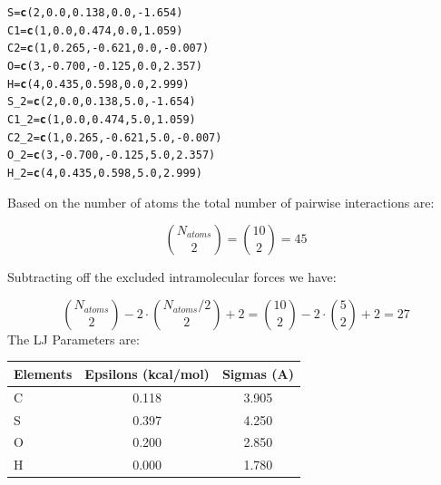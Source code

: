 \documentclass{article}\usepackage[]{graphicx}\usepackage[]{color}
\makeatletter
\newcommand{\hlnum}[1]{\textcolor[rgb]{0.686,0.059,0.569}{#1}}%
\newcommand{\hlopt}[1]{\textcolor[rgb]{0,0,0}{#1}}%
\newcommand{\hlstd}[1]{\textcolor[rgb]{0.345,0.345,0.345}{#1}}%
\newcommand{\hlkwb}[1]{\textcolor[rgb]{0.69,0.353,0.396}{#1}}%
\newcommand{\hlkwd}[1]{\textcolor[rgb]{0.737,0.353,0.396}{\textbf{#1}}}%
\newenvironment{kframe}{%
 \def\at@end@of@kframe{}%
 \ifinner\ifhmode%
  \def\at@end@of@kframe{\end{minipage}}%
  \begin{minipage}{\columnwidth}%
 \fi\fi%
 \def\FrameCommand##1{\hskip\@totalleftmargin \hskip-\fboxsep
 \colorbox{shadecolor}{##1}\hskip-\fboxsep
     \hskip-\linewidth \hskip-\@totalleftmargin \hskip\columnwidth}%
 \MakeFramed {\advance\hsize-\width
   \@totalleftmargin\z@ \linewidth\hsize
   \@setminipage}}%
 {\par\unskip\endMakeFramed%
 \at@end@of@kframe}
\newenvironment{knitrout}{}{} %
\makeatother
\begin{document}
\begin{knitrout}
\color{fgcolor}\begin{kframe}
\begin{alltt}
  \hlstd{S}\hlkwb{=}\hlkwd{c}\hlstd{(}\hlnum{2}\hlstd{,}\hlnum{0.0}\hlstd{,}\hlnum{0.138}\hlstd{,}\hlnum{0.0}\hlstd{,}\hlopt{-}\hlnum{1.654}\hlstd{)}
  \hlstd{C1}\hlkwb{=}\hlkwd{c}\hlstd{(}\hlnum{1}\hlstd{,}\hlnum{0.0}\hlstd{,}\hlnum{0.474}\hlstd{,}\hlnum{0.0}\hlstd{,}\hlnum{1.059}\hlstd{)}
  \hlstd{C2}\hlkwb{=}\hlkwd{c}\hlstd{(}\hlnum{1}\hlstd{,}\hlnum{0.265}\hlstd{,}\hlopt{-}\hlnum{0.621}\hlstd{,}\hlnum{0.0}\hlstd{,}\hlopt{-}\hlnum{0.007}\hlstd{)}
  \hlstd{O}\hlkwb{=}\hlkwd{c}\hlstd{(}\hlnum{3}\hlstd{,}\hlopt{-}\hlnum{0.700}\hlstd{,}\hlopt{-}\hlnum{0.125}\hlstd{,}\hlnum{0.0}\hlstd{,}\hlnum{2.357}\hlstd{)}
  \hlstd{H}\hlkwb{=}\hlkwd{c}\hlstd{(}\hlnum{4}\hlstd{,}\hlnum{0.435}\hlstd{,}\hlnum{0.598}\hlstd{,}\hlnum{0.0}\hlstd{,}\hlnum{2.999}\hlstd{)}
  \hlstd{S_2}\hlkwb{=}\hlkwd{c}\hlstd{(}\hlnum{2}\hlstd{,}\hlnum{0.0}\hlstd{,}\hlnum{0.138}\hlstd{,}\hlnum{5.0}\hlstd{,}\hlopt{-}\hlnum{1.654}\hlstd{)}
  \hlstd{C1_2}\hlkwb{=}\hlkwd{c}\hlstd{(}\hlnum{1}\hlstd{,}\hlnum{0.0}\hlstd{,}\hlnum{0.474}\hlstd{,}\hlnum{5.0}\hlstd{,}\hlnum{1.059}\hlstd{)}
  \hlstd{C2_2}\hlkwb{=}\hlkwd{c}\hlstd{(}\hlnum{1}\hlstd{,}\hlnum{0.265}\hlstd{,}\hlopt{-}\hlnum{0.621}\hlstd{,}\hlnum{5.0}\hlstd{,}\hlopt{-}\hlnum{0.007}\hlstd{)}
  \hlstd{O_2}\hlkwb{=}\hlkwd{c}\hlstd{(}\hlnum{3}\hlstd{,}\hlopt{-}\hlnum{0.700}\hlstd{,}\hlopt{-}\hlnum{0.125}\hlstd{,}\hlnum{5.0}\hlstd{,}\hlnum{2.357}\hlstd{)}
  \hlstd{H_2}\hlkwb{=}\hlkwd{c}\hlstd{(}\hlnum{4}\hlstd{,}\hlnum{0.435}\hlstd{,}\hlnum{0.598}\hlstd{,}\hlnum{5.0}\hlstd{,}\hlnum{2.999}\hlstd{)}
\end{alltt}
\end{kframe}
\end{knitrout}


Based on the number of atoms the total number of pairwise interactions are:

\[ \binom{N_{atoms}}{2}=\binom{10}{2} = 45 \]

Subtracting off the excluded intramolecular forces we have:

\[  \binom{N_{atoms}}{2}-2\cdot\binom{N_{atoms}/2}{2}+2=\binom{10}{2}-2\cdot\binom{5}{2}+2=27\]
The LJ Parameters are:

\begin{table}[ht]
\centering
\begin{tabular}{|l||c||c|}
  \hline
Elements & Epsilons (kcal/mol) & Sigmas (A) \\ 
  \hline
C & 0.118 & 3.905 \\ 
  S & 0.397 & 4.250 \\ 
  O & 0.200 & 2.850 \\ 
  H & 0.000 & 1.780 \\ 
   \hline
\end{tabular}
\end{table}
\end{document}
